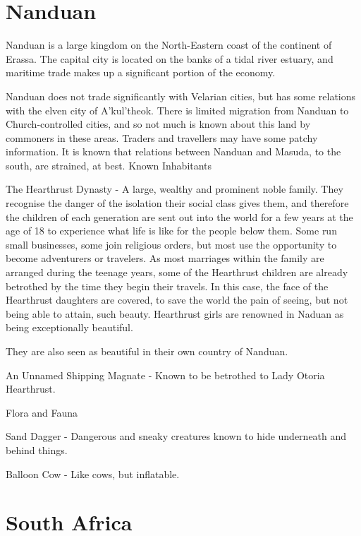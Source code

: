 \smallskip



\section{Nanduan} 

Nanduan is a large kingdom on the North-Eastern coast of the continent of Erassa. The capital city is located on the banks of a tidal river estuary, and maritime trade makes up a significant portion of the economy.

Nanduan does not trade significantly with Velarian cities, but has some relations with the elven city of A'kul'theok. There is limited migration from Nanduan to Church-controlled cities, and so not much is known about this land by commoners in these areas. Traders and travellers may have some patchy information. It is known that relations between Nanduan and Masuda, to the south, are strained, at best.
Known Inhabitants

    The Hearthrust Dynasty - A large, wealthy and prominent noble family. They recognise the danger of the isolation their social class gives them, and therefore the children of each generation are sent out into the world for a few years at the age of 18 to experience what life is like for the people below them. Some run small businesses, some join religious orders, but most use the opportunity to become adventurers or travelers. As most marriages within the family are arranged during the teenage years, some of the Hearthrust children are already betrothed by the time they begin their travels. In this case, the face of the Hearthrust daughters are covered, to save the world the pain of seeing, but not being able to attain, such beauty. Hearthrust girls are renowned in Naduan as being exceptionally beautiful.

    They are also seen as beautiful in their own country of Nanduan.

    An Unnamed Shipping Magnate - Known to be betrothed to Lady Otoria Hearthrust.

Flora and Fauna

    Sand Dagger - Dangerous and sneaky creatures known to hide underneath and behind things.

    Balloon Cow - Like cows, but inflatable.


\smallskip


\section{South Africa}

